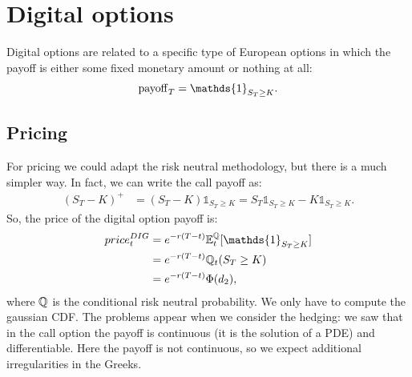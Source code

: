 \section{Digital options}
Digital options are related to a specific type of European options in which the payoff is either some fixed monetary amount or nothing at all:
\begin{equation}
    \pay_T = \mathds{1}_{S_T\ge K}.
\end{equation}

\subsection{Pricing}
For pricing we could adapt the risk neutral methodology, but there is a much simpler way. In fact, we can write the call payoff as:
\begin{align}
    (S_T-K)^+ &= (S_T-K)\mathds{1}_{S_T\ge K} = S_T\mathds{1}_{S_T\ge K} - K\mathds{1}_{S_T\ge K}.
\end{align}
So, the price of the digital option payoff is:
\begin{align}
    \notag price^{DIG}_t &= e^{-r(T-t)}\expect_t[\mathds{1}_{S_T\ge K}] \\
    &=
    \notag e^{-r(T-t)}\Qmeas_t(S_T\ge K) \\
    &=
    e^{-r(T-t)}\Phi(d_2),
\end{align}
where $\mathbb{Q}$ is the conditional risk neutral probability. We only have to compute the gaussian CDF. The problems appear when we consider the hedging: we saw that in the call option the payoff is continuous (it is the solution of a PDE) and differentiable. Here the payoff is not continuous, so we expect additional irregularities in the Greeks.

